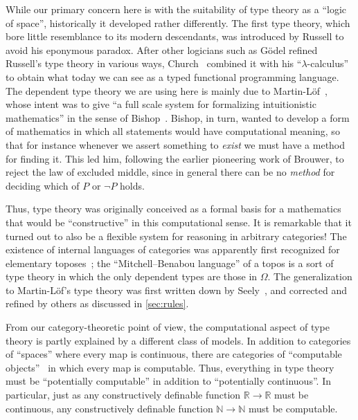 \documentclass[10pt]{article}
\def\N{\mathbb{N}}
\def\R{\mathbb{R}}
\numberwithin{equation}{section}
\begin{document}
While our primary concern here is with the suitability of type theory as a ``logic of space'', historically it developed rather differently.
The first type theory, which bore little resemblance to its modern descendants, was introduced by Russell to avoid his eponymous paradox.
After other logicians such as G\"odel refined Russell's type theory in various ways, Church~\cite{Church:1940tu,Church:1941tc} combined it with his ``$\lambda$-calculus'' to obtain what today we can see as a typed functional programming language.
The dependent type theory we are using here %
is mainly due to Martin-L\"{o}f~\cite{martinlof:itt-pred,martinlof:itt}, whose intent was to give ``a full scale system for formalizing intuitionistic mathematics'' in the sense of Bishop~\cite{bishop:fca,bb:constr-analysis}.
Bishop, in turn, wanted to develop a form of mathematics in which all statements would have computational meaning, so that for instance whenever we assert something to \emph{exist} we must have a method for finding it.
This led him, following the earlier pioneering work of Brouwer, to reject the law of excluded middle, since in general there can be no \emph{method} for deciding which of $P$ or $\neg P$ holds.

Thus, type theory was originally conceived as a formal basis for a mathematics that would be ``constructive'' in this computational sense.
It is remarkable that it turned out to also be a flexible system for reasoning in arbitrary categories!
The existence of internal languages of categories was apparently first recognized for elementary toposes~\cite{ls:itt-free-topos,mitchell:topoi-sets,bj:logique-des-topos}; the ``Mitchell--Benabou language'' %
of a topos is a sort of type theory in which the only dependent types are those in $\Omega$.
The generalization to Martin-L\"{o}f's type theory was first written down by Seely~\cite{seely:lccc-tt}, and corrected and refined by others as discussed in \cref{sec:rules}.

From our category-theoretic point of view, the computational aspect of type theory is partly explained by a different class of models.
In addition to categories of ``spaces'' where every map is continuous, there are categories of ``computable objects''~\cite{hyland:eff,oosten:realiz} in which every map is computable. %
Thus, everything in type theory
must be ``potentially computable'' in addition to ``potentially continuous''.
In particular, just as any constructively definable function $\R\to\R$ must be continuous, any constructively definable function $\N\to\N$ must be computable.
\end{document}
